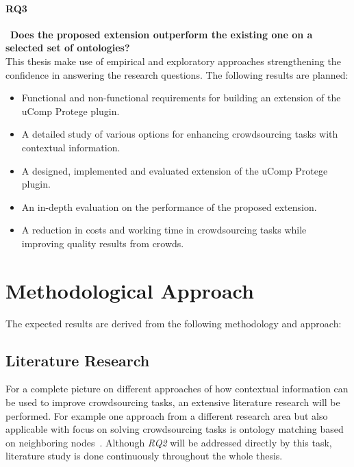 \documentclass[12pt, notitlepage]{article}
\begin{document}
\paragraph{RQ3}~\textbf{Does the proposed extension outperform the existing one on a selected set of ontologies?}\\
This thesis make use of empirical and exploratory approaches strengthening the confidence in answering the research questions. The following results are planned:
\begin{itemize}
	\item Functional and non-functional requirements for building an extension of the uComp Protege plugin.
	\item A detailed study of various options for enhancing crowdsourcing tasks with contextual information.
	\item A designed, implemented and evaluated extension of the uComp Protege plugin.
	\item An in-depth evaluation on the performance of the proposed extension.
	\item A reduction in costs and working time in crowdsourcing tasks while improving quality results from crowds.
\end{itemize}
\section{Methodological Approach}


The expected results are derived from the following methodology and approach:
\subsection{Literature Research}
For a complete picture on different approaches of how contextual information can be used to improve crowdsourcing tasks, an extensive literature research will be performed. For example one approach from a different research area but also applicable with focus on solving crowdsourcing tasks is ontology matching based on neighboring nodes~\cite{hoffmann2010context}. Although \emph{RQ2} will be addressed directly by this task, literature study is done continuously throughout the whole thesis. 
\end{document}
